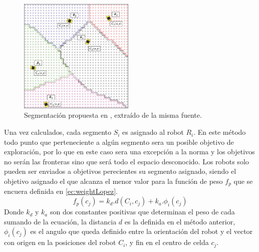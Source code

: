 \begin{figure}[H]
  \center
  \includegraphics[width=5.5cm]{imagenes/centerCoord.png}
  \caption[Segmentación propuesta en \cite{Lopez-Perez2018}]{Segmentación propuesta en \cite{Lopez-Perez2018}, extraído de la misma fuente.}\label{fig:ejemploCoordCenter}
\end{figure} 

Una vez calculados, cada segmento $S_i$ es asignado al robot $R_i$. En este método todo punto que perteneciente a algún segmento sera un posible objetivo de exploración, por lo que en este caso sera una excepción a la norma y los objetivos no serán las fronteras sino que será todo el espacio desconocido. Los robots solo pueden ser enviados a objetivos perecientes su segmento asignado, siendo el objetivo asignado el que alcanza el menor valor para la función de peso $f_p$ que se encuera definida en \eqref{ec:weightLopez}.
\begin{equation}\label{ec:weightLopez}
  f_p(c_j) = k_d.d(C_i,c_j) + k_a.\phi_i(c_j)
\end{equation}
Donde $k_d$ y $k_a$ son dos constantes positivas que determinan el peso de cada sumando de la ecuación, la distancia $d$ es la definida en el método anterior, $\phi_i(c_j)$ es el angulo que queda definido entre la orientación del robot y el vector con origen en la posiciones del robot $C_i$, y fin en el centro de celda $c_j$. 


